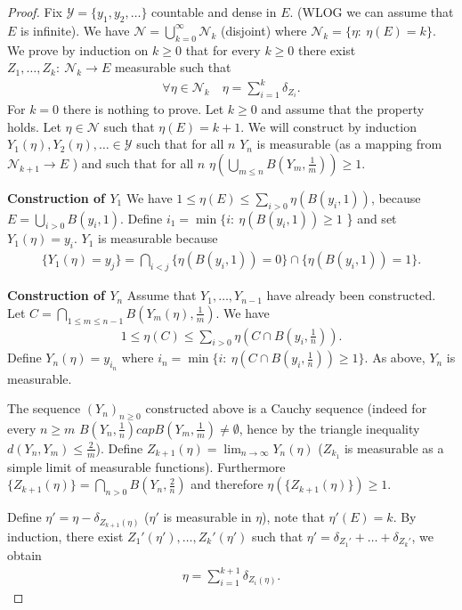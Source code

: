 \begin{proof}
	Fix $ \mathcal{Y}=\{y_1,y_2,\ldots\}$ countable and dense in $E$. (WLOG we can assume that $E$ is infinite). We have $\mathcal{N}= \bigcup_{k=0}^{\infty}\mathcal{N}_{k}$ (disjoint) where $\mathcal{N}_{k}=\{ \eta:\ \eta(E)=k\}$. We prove by induction on $k\geq 0$ that for every $k\geq 0$ there exist $Z_1,\ldots ,Z_k:\ \mathcal{N}_{k} \to E$ measurable such that 
	\begin{align}
		\forall \eta \in \mathcal{N}_{k} \quad \eta = \sum_{i=1}^{k} \delta_{Z_i}.
	\end{align}
	For $k=0$ there is nothing to prove. Let $k\geq 0$ and assume that the property holds. Let $\eta \in \mathcal{N}$ such that $\eta(E) = k+1$. We will construct by induction $Y_1(\eta), Y_2(\eta),\ldots \in \mathcal{Y}$ such that for all $n$ $Y_n$ is measurable (as a mapping from $\mathcal{N}_{k+1} \to E$ ) and such that for all $n$ $\eta( \bigcup_{m\leq n}B(Y_m,\frac{1}{m})) \geq 1$.	

\noindent \textbf{Construction of $Y_1$}
We have $1\leq \eta(E) \leq \sum_{i> 0}^{} \eta ( B(y_i,1))$, because $E=\bigcup_{i> 0}B(y_i,1)$. Define $i_{1}= \min\{i:\ \eta(B(y_i,1))\geq 1$ \} and set $Y_1(\eta) = y_i$. $Y_1$ is measurable because 
\begin{align}
	\{ Y_1(\eta ) =y_j\} = \bigcap _{i<j}\{ \eta(B(y_i, 1))=0 \} \cap \{ \eta (B(y_i, 1))=1\}.
\end{align}

\noindent \textbf{Construction of $Y_n$} 
Assume that $Y_1,\ldots ,Y_{n-1}$ have already been constructed. Let $C=\bigcap_{1\leq m \leq n-1}B(Y_m (\eta), \frac{1}{m})$. We have 
\begin{align}
	1 \leq \eta(C) \leq \sum_{i> 0}^{} \eta \left( C \cap B\left(y_i, \frac{1}{n}\right)\right).
\end{align}
Define $Y_n(\eta) = y_{i_{n}}$ where $i_{n}=\min\{ i:\ \eta(C \cap B(y_i, \frac{1}{n})) \geq 1\}$. As above, $Y_n$ is measurable.

The sequence $(Y_n)_{n\geq 0}$ constructed above is a Cauchy sequence (indeed for every $n\geq m$ $B(Y_n, \frac{1}{n}) cap B(Y_m, \frac{1}{m}) \neq \emptyset$, hence by the triangle inequality $d(Y_n, Y_m) \leq \frac{2}{m}$). Define $Z_{k+1}(\eta) = \lim_{n\to \infty }Y_{n}(\eta)$ ($Z_{k_1}$ is measurable as a simple limit of measurable functions). Furthermore $\{Z_{k+1}(\eta)\} = \bigcap_{n> 0}B(Y_n, \frac{2}{n})$ and therefore $\eta(\{Z_{k+1}(\eta) \}) \geq 1$. 

Define $\eta' = \eta - \delta_{Z_{k+1}(\eta)}$ ($\eta'$ is measurable in $\eta$), {\color{blue}note that} $\eta'(E) =k$. By induction, there exist $Z_{1}'(\eta'),\ldots, Z_{k}'(\eta')$ such that $\eta' = \delta_{Z_1'}+\ldots + \delta_{Z_k'}$, we obtain
\begin{align}
	\eta = \sum_{i=1}^{k+1} \delta_{Z_i(\eta)}.
\end{align}
\end{proof}

